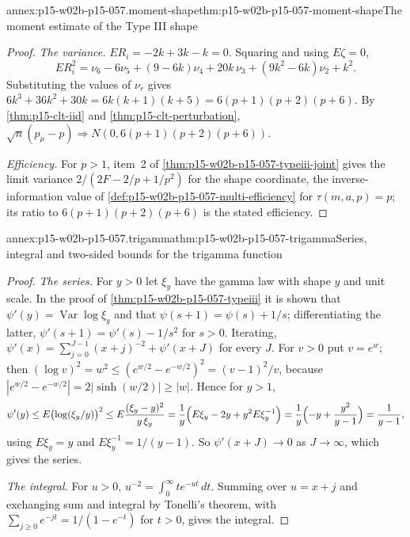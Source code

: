 \begin{annexitem}{annex:p15-w02b-p15-057.moment-shape}{thm:p15-w02b-p15-057-moment-shape}{The moment estimate of the Type III shape}
\begin{proof}
\emph{The variance.} \(ER_i=-2k+3k-k=0\). Squaring and using
\(E\zeta=0\),
\[
 ER_i^2=\nu_6-6\nu_5+(9-6k)\nu_4+20k\,\nu_3+(9k^2-6k)\nu_2+k^2 .
\]
Substituting the values of \(\nu_r\) gives
\(6k^3+36k^2+30k=6k(k+1)(k+5)=6(p+1)(p+2)(p+6)\). By
\cref{thm:p15-clt-iid} and \cref{thm:p15-clt-perturbation},
\(\sqrt n(p_\mu-p)\Rightarrow N(0,6(p+1)(p+2)(p+6))\).

\emph{Efficiency.} For \(p>1\), item~2 of
\cref{thm:p15-w02b-p15-057-typeiii-joint} gives the limit variance
\(2/(2F-2/p+1/p^2)\) for the shape coordinate, the inverse-information
value of \cref{def:p15-w02b-p15-057-multi-efficiency} for
\(\tau(m,a,p)=p\); its ratio to \(6(p+1)(p+2)(p+6)\) is the stated
efficiency.
\end{proof}
\end{annexitem}

\begin{annexitem}{annex:p15-w02b-p15-057.trigamma}{thm:p15-w02b-p15-057-trigamma}{Series, integral and two-sided bounds for the trigamma function}
\begin{proof}
\emph{The series.} For \(y>0\) let \(\xi_y\) have the gamma law with shape
\(y\) and unit scale. In the proof of
\cref{thm:p15-w02b-p15-057-typeiii} it is shown that
\(\psi'(y)=\operatorname{Var}\log\xi_y\) and that
\(\psi(s+1)=\psi(s)+1/s\); differentiating the latter,
\(\psi'(s+1)=\psi'(s)-1/s^2\) for \(s>0\). Iterating,
\(\psi'(x)=\sum_{j=0}^{J-1}(x+j)^{-2}+\psi'(x+J)\) for every \(J\). For
\(v>0\) put \(v=e^w\); then \((\log v)^2=w^2\leq(e^{w/2}-e^{-w/2})^2=
(v-1)^2/v\), because \(|e^{w/2}-e^{-w/2}|=2|\sinh(w/2)|\geq|w|\). Hence for
\(y>1\),
\[
 \psi'(y)\leq E\bigl(\log(\xi_y/y)\bigr)^2\leq
 E\frac{(\xi_y-y)^2}{y\,\xi_y}
 =\frac1y\Bigl(E\xi_y-2y+y^2E\xi_y^{-1}\Bigr)
 =\frac1y\Bigl(-y+\frac{y^2}{y-1}\Bigr)=\frac1{y-1},
\]
using \(E\xi_y=y\) and \(E\xi_y^{-1}=1/(y-1)\). So
\(\psi'(x+J)\to0\) as \(J\to\infty\), which gives the series.

\emph{The integral.} For \(u>0\), \(u^{-2}=\int_0^\infty te^{-ut}\,dt\).
Summing over \(u=x+j\) and exchanging sum and integral by Tonelli's
theorem, with \(\sum_{j\geq0}e^{-jt}=1/(1-e^{-t})\) for \(t>0\), gives the
integral.


\end{proof}
\end{annexitem}
